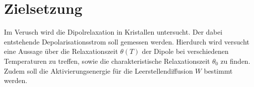 \section{Zielsetzung}
\label{sec:Zielsetzung}
Im Verusch wird die Dipolrelaxation in Kristallen untersucht.
Der dabei entstehende Depolarisationsstrom soll gemessen werden.
Hierdurch wird versucht eine Aussage über die Relaxationszeit $\theta(T)$ der Dipole bei verschiedenen Temperaturen zu treffen,
sowie die charakteristische Relaxationszeit $\theta_0$ zu finden.
Zudem soll die Aktivierungsenergie für die Leerstellendiffusion $W$ bestimmt werden.